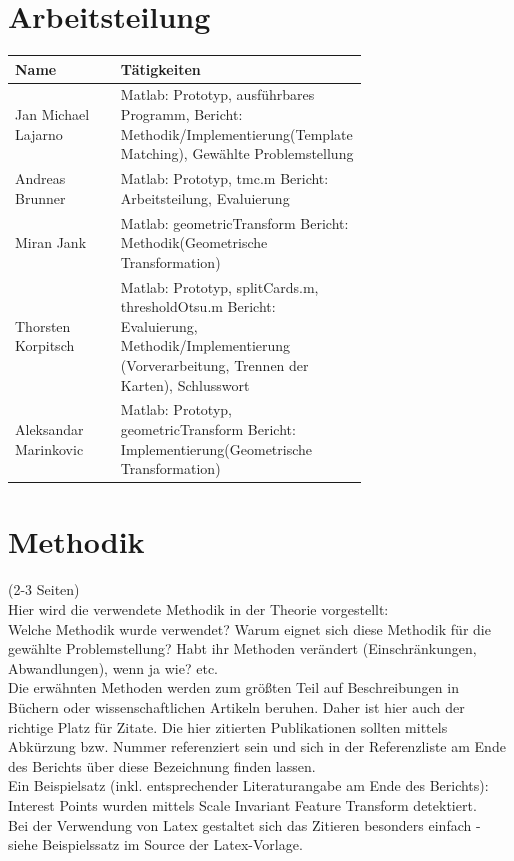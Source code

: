 \documentclass[paper=A4, deutsch]{scrartcl}
\begin{document}
\section{Arbeitsteilung}
\begin{center}
  \begin{tabular}{ |l |p{0.7\linewidth} | }
    \hline
  Name & Tätigkeiten\\
    \hline
		Jan Michael Lajarno & Matlab: Prototyp, ausführbares Programm, \newline Bericht: Methodik/Implementierung(Template Matching), Gewählte Problemstellung\\
		\hline
		Andreas Brunner & Matlab: Prototyp, tmc.m \newline Bericht: Arbeitsteilung, Evaluierung\\
		\hline
		Miran Jank & Matlab: geometricTransform \newline Bericht: Methodik(Geometrische Transformation)\\
		\hline
		Thorsten Korpitsch & Matlab: Prototyp, splitCards.m, thresholdOtsu.m \newline Bericht: Evaluierung, Methodik/Implementierung (Vorverarbeitung, Trennen der Karten), Schlusswort\\
		\hline
		Aleksandar Marinkovic & Matlab: Prototyp, geometricTransform \newline Bericht: Implementierung(Geometrische Transformation)\\ 
		\hline
  \end{tabular}
\end{center}


\section{Methodik}
(2-3 Seiten)\\
Hier wird die verwendete Methodik in der Theorie vorgestellt:\\
Welche Methodik wurde verwendet? Warum eignet sich diese Methodik für die gewählte Problemstellung? Habt ihr Methoden verändert (Einschränkungen, Abwandlungen), wenn ja wie? etc.\\
Die erwähnten Methoden werden zum größten Teil auf Beschreibungen in Büchern oder wissenschaftlichen Artikeln beruhen. Daher ist hier auch der richtige Platz für Zitate. Die hier zitierten Publikationen sollten mittels Abkürzung bzw. Nummer referenziert sein und sich in der Referenzliste am Ende des Berichts über diese Bezeichnung finden lassen.\\
Ein Beispielsatz (inkl. entsprechender Literaturangabe am Ende des Berichts): Interest Points wurden mittels Scale Invariant Feature Transform detektiert.\\
Bei der Verwendung von Latex gestaltet sich das Zitieren besonders einfach - siehe Beispielssatz im Source der Latex-Vorlage.\\
\end{document}
